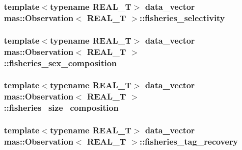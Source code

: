 \subsubsection[{fisheries\+\_\+selectivity}]{\setlength{\rightskip}{0pt plus 5cm}template$<$typename R\+E\+A\+L\+\_\+\+T$>$ data\+\_\+vector {\bf mas\+::\+Observation}$<$ R\+E\+A\+L\+\_\+\+T $>$\+::fisheries\+\_\+selectivity}\label{classmas_1_1_observation_af044bb2c45e00485bd98f70e6d11f470}
\hypertarget{classmas_1_1_observation_ae7b1b9a34feb637eee59ae13592b2763}{}
\subsubsection[{fisheries\+\_\+sex\+\_\+composition}]{\setlength{\rightskip}{0pt plus 5cm}template$<$typename R\+E\+A\+L\+\_\+\+T$>$ data\+\_\+vector {\bf mas\+::\+Observation}$<$ R\+E\+A\+L\+\_\+\+T $>$\+::fisheries\+\_\+sex\+\_\+composition}\label{classmas_1_1_observation_ae7b1b9a34feb637eee59ae13592b2763}
\hypertarget{classmas_1_1_observation_aac8ee77d201137577d47e04f56caf02a}{}
\subsubsection[{fisheries\+\_\+size\+\_\+composition}]{\setlength{\rightskip}{0pt plus 5cm}template$<$typename R\+E\+A\+L\+\_\+\+T$>$ data\+\_\+vector {\bf mas\+::\+Observation}$<$ R\+E\+A\+L\+\_\+\+T $>$\+::fisheries\+\_\+size\+\_\+composition}\label{classmas_1_1_observation_aac8ee77d201137577d47e04f56caf02a}
\hypertarget{classmas_1_1_observation_a853ad19a7c4de86a927c311e51d7e484}{}
\subsubsection[{fisheries\+\_\+tag\+\_\+recovery}]{\setlength{\rightskip}{0pt plus 5cm}template$<$typename R\+E\+A\+L\+\_\+\+T$>$ data\+\_\+vector {\bf mas\+::\+Observation}$<$ R\+E\+A\+L\+\_\+\+T $>$\+::fisheries\+\_\+tag\+\_\+recovery}\label{classmas_1_1_observation_a853ad19a7c4de86a927c311e51d7e484}
\hypertarget{classmas_1_1_observation_a56d2181956836fe2e3d7d39d17795929}{}
